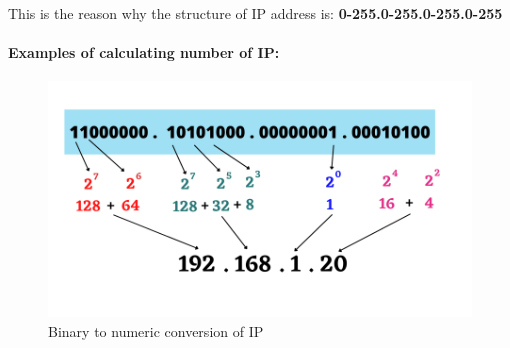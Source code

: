 \begin{flushleft}
\begin{itemize}
\end{itemize}

	This is the reason why the structure of IP address is: \textbf{0-255.0-255.0-255.0-255}

\newpage
\paragraph{Examples of calculating number of IP:}
	\begin{figure}[h!]
	\centering
	\includegraphics[scale=0.5]{content/chapter14/images/example.png}
	\caption{Binary to numeric conversion of IP}
	\label{fig:Ip}
\end{figure}

\end{flushleft}


